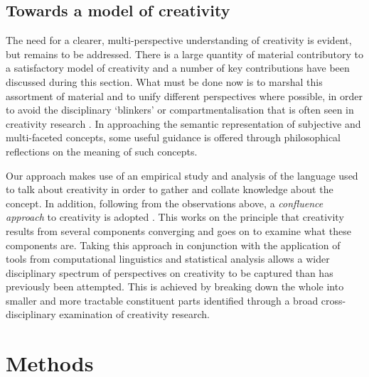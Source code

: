 \documentclass[10pt,letterpaper]{article}
\begin{document}
\subsection*{Towards a model of creativity}\label{progressingForwards}

The need for a clearer, multi-perspective understanding of creativity is evident, but remains to be addressed. There is a large quantity of material contributory to a satisfactory model of creativity and a number of key contributions have been discussed during this section. What must be done now is to marshal this assortment of material and to unify different perspectives where possible, in order to avoid the disciplinary `blinkers' or compartmentalisation that is often seen in creativity research \cite{hennessey10}. In approaching the semantic representation of subjective and multi-faceted concepts, some useful guidance is offered through philosophical reflections on the meaning of such concepts. 


Our approach makes use of an empirical study and analysis of the language used to talk about creativity in order to gather and collate knowledge about the concept. In addition, following from the observations above, a {\em  confluence approach\/} to creativity is adopted \cite{sternberg99a,mayer99,ivcevic09}. This works on the principle that creativity results from several components converging and goes on to examine what these components are. Taking this approach in conjunction with the application of tools from computational linguistics and statistical analysis allows a wider disciplinary spectrum of perspectives on creativity to be captured than has previously been attempted. This is achieved by breaking down the whole into smaller and more tractable constituent parts identified through a broad cross-disciplinary examination of creativity research. 


\section*{Methods}
\label{methodology}
\end{document}
